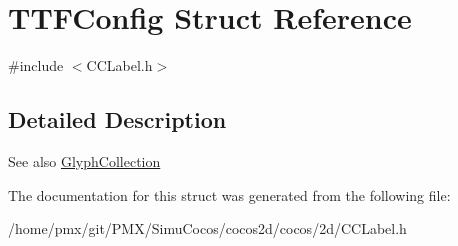 \hypertarget{structTTFConfig}{}\section{T\+T\+F\+Config Struct Reference}
\label{structTTFConfig}


{\ttfamily \#include $<$C\+C\+Label.\+h$>$}



\subsection{Detailed Description}
\begin{DoxySeeAlso}{See also}
{\ttfamily \hyperlink{group__base_gac5e83e2fc436edc7833f2bcabad984f3}{Glyph\+Collection}} 
\end{DoxySeeAlso}


The documentation for this struct was generated from the following file\+:\begin{DoxyCompactItemize}
\item 
/home/pmx/git/\+P\+M\+X/\+Simu\+Cocos/cocos2d/cocos/2d/C\+C\+Label.\+h\end{DoxyCompactItemize}
